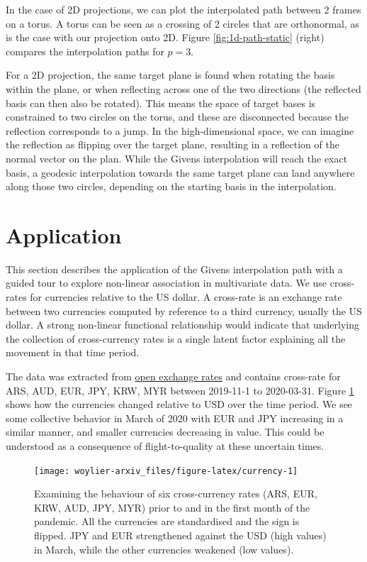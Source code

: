 \documentclass{article}
\begin{document}
In the case of 2D projections, we can plot the interpolated path between
2 frames on a torus. A torus can be seen as a crossing of 2 circles that
are orthonormal, as is the case with our projection onto 2D. Figure
\ref{fig:1d-path-static} (right) compares the interpolation paths for
\(p=3\).

For a 2D projection, the same target plane is found when rotating the
basis within the plane, or when reflecting across one of the two
directions (the reflected basis can then also be rotated). This means
the space of target bases is constrained to two circles on the torus,
and these are disconnected because the reflection corresponds to a jump.
In the high-dimensional space, we can imagine the reflection as flipping
over the target plane, resulting in a reflection of the normal vector on
the plan. While the Givens interpolation will reach the exact basis, a
geodesic interpolation towards the same target plane can land anywhere
along those two circles, depending on the starting basis in the
interpolation.

\hypertarget{application}{%
\section{Application}\label{application}}

This section describes the application of the Givens interpolation path
with a guided tour to explore non-linear association in multivariate
data. We use cross-rates for currencies relative to the US dollar. A
cross-rate is an exchange rate between two currencies computed by
reference to a third currency, usually the US dollar. A strong
non-linear functional relationship would indicate that underlying the
collection of cross-currency rates is a single latent factor explaining
all the movement in that time period.

The data was extracted from \href{https://openexchangerates.org}{open
exchange rates} and contains cross-rate for ARS, AUD, EUR, JPY, KRW, MYR
between 2019-11-1 to 2020-03-31. Figure \ref{fig:currency} shows how the
currencies changed relative to USD over the time period. We see some
collective behavior in March of 2020 with EUR and JPY increasing in a
similar manner, and smaller currencies decreasing in value. This could
be understood as a consequence of flight-to-quality at these uncertain
times.

\begin{figure}
\texttt{[image: woylier-arxiv\_files/figure-latex/currency-1]} \caption{Examining the behaviour of six cross-currency rates (ARS, EUR, KRW, AUD, JPY, MYR) prior to and in the first month of the pandemic. All the currencies are standardised and the sign is flipped. JPY and EUR strengthened against the USD (high values) in March, while the other currencies weakened (low values).}\label{fig:currency}
\end{figure}
\end{document}
